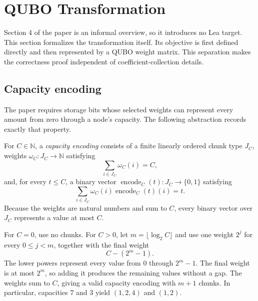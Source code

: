 
\setcounter{section}{4}
\section{QUBO Transformation}

Section 4 of the paper is an informal overview, so it introduces no Lea target.
This section formalizes the transformation itself. Its objective is first
defined directly and then represented by a QUBO weight matrix. This separation
makes the correctness proof independent of coefficient-collection details.

\subsection{Capacity encoding}

The paper requires storage bits whose selected weights can represent every
amount from zero through a node's capacity. The following abstraction records
exactly that property.

\begin{definition}\label{def:capacity-encoding}
For $C\in\mathbb{N}$, a \emph{capacity encoding} consists of a finite linearly
ordered chunk type $J_C$, weights $\omega_C:J_C\to\mathbb{N}$ satisfying
\[
  \sum_{i\in J_C}\omega_C(i)=C,
\]
and, for every $t\leq C$, a binary vector
$\operatorname{encode}_C(t):J_C\to\{0,1\}$ satisfying
\[
  \sum_{i\in J_C}\omega_C(i)\operatorname{encode}_C(t)(i)=t.
\]
Because the weights are natural numbers and sum to $C$, every binary vector
over $J_C$ represents a value at most $C$.
\end{definition}

\begin{definition}
  \label{def:binary-capacity-encoding}
For $C=0$, use no chunks. For $C>0$, let
$m=\lfloor\log_2 C\rfloor$ and use one weight $2^j$ for every $0\leq j<m$,
together with the final weight
\[
  C-(2^m-1).
\]
The lower powers represent every value from $0$ through $2^m-1$. The final
weight is at most $2^m$, so adding it produces the remaining values without a
gap. The weights sum to $C$, giving a valid capacity encoding with $m+1$
chunks. In particular, capacities $7$ and $3$ yield $(1,2,4)$ and $(1,2)$.
\end{definition}

